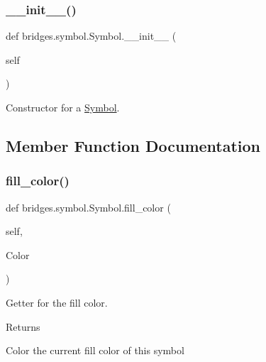 \subsubsection{\texorpdfstring{\+\_\+\+\_\+init\+\_\+\+\_\+()}{\_\_init\_\_()}}
{\footnotesize\ttfamily def bridges.\+symbol.\+Symbol.\+\_\+\+\_\+init\+\_\+\+\_\+ (\begin{DoxyParamCaption}\item[{}]{self }\end{DoxyParamCaption})}



Constructor for a \mbox{\hyperlink{classbridges_1_1symbol_1_1_symbol}{Symbol}}. 



\subsection{Member Function Documentation}
\mbox{\label{classbridges_1_1symbol_1_1_symbol_a1a5e9147e426fb7ec74fe60a5cdc9ded}} 
\subsubsection{\texorpdfstring{fill\+\_\+color()}{fill\_color()}\hspace{0.1cm}{\footnotesize\ttfamily [1/2]}}
{\footnotesize\ttfamily def bridges.\+symbol.\+Symbol.\+fill\+\_\+color (\begin{DoxyParamCaption}\item[{}]{self,  }\item[{}]{Color }\end{DoxyParamCaption})}



Getter for the fill color. 

\begin{DoxyReturn}{Returns}


Color the current fill color of this symbol 
\end{DoxyReturn}
\mbox{\label{classbridges_1_1symbol_1_1_symbol_acec37468f0018db1416622062983eb46}} 
